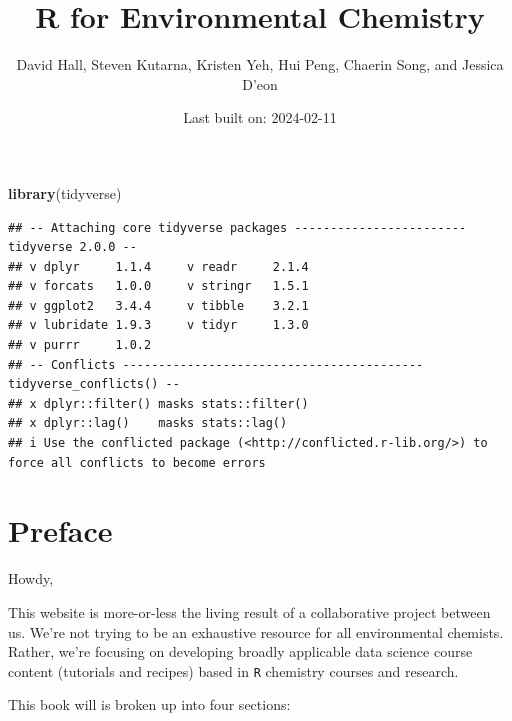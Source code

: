 \documentclass[
]{book}
\title{R for Environmental Chemistry}
\author{David Hall, Steven Kutarna, Kristen Yeh, Hui Peng, Chaerin Song, and Jessica D'eon}
\date{Last built on: 2024-02-11}
\newenvironment{Shaded}{\begin{snugshade}}{\end{snugshade}}
\newcommand{\FunctionTok}[1]{\textcolor[rgb]{0.13,0.29,0.53}{\textbf{#1}}}
\newcommand{\NormalTok}[1]{#1}
\begin{document}
\maketitle

{
\setcounter{tocdepth}{1}
\tableofcontents
}
\begin{Shaded}
\begin{Highlighting}[]
\FunctionTok{library}\NormalTok{(tidyverse)}
\end{Highlighting}
\end{Shaded}

\begin{verbatim}
## -- Attaching core tidyverse packages ------------------------ tidyverse 2.0.0 --
## v dplyr     1.1.4     v readr     2.1.4
## v forcats   1.0.0     v stringr   1.5.1
## v ggplot2   3.4.4     v tibble    3.2.1
## v lubridate 1.9.3     v tidyr     1.3.0
## v purrr     1.0.2     
## -- Conflicts ------------------------------------------ tidyverse_conflicts() --
## x dplyr::filter() masks stats::filter()
## x dplyr::lag()    masks stats::lag()
## i Use the conflicted package (<http://conflicted.r-lib.org/>) to force all conflicts to become errors
\end{verbatim}

\hypertarget{preface}{%
\chapter*{Preface}\label{preface}}

Howdy,

This website is more-or-less the living result of a collaborative project between us. We're not trying to be an exhaustive resource for all environmental chemists. Rather, we're focusing on developing broadly applicable data science course content (tutorials and recipes) based in \texttt{R} chemistry courses and research.

This book will is broken up into four sections:
\end{document}
